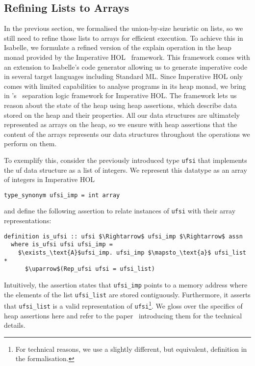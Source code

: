 \documentclass[
  sigplan,
  10pt,
  anonymous,
  review,
  ]{acmart}
\begin{document}
\subsection{Refining Lists to Arrays\label{sec:imperative_hol}}
In the previous section, we formalised the union-by-size heuristic on lists,
so we still need to refine those lists to arrays for efficient execution. 
To achieve this in Isabelle, we formulate a refined version of the explain operation in the heap monad provided by the Imperative HOL~\cite{imperative_hol} framework.
This framework comes with an extension to Isabelle's code generator allowing us to generate imperative code in several target languages including Standard ML. 
Since Imperative HOL only comes with limited capabilities to analyse programs in its heap monad, 
we bring in \citeauthor{uf_isabelle}'s~\cite{uf_isabelle} separation logic framework for Imperative HOL.
The framework lets us reason about the state of the heap using heap assertions, which describe data stored on the heap and their properties.
All our data structures are ultimately represented as arrays on the heap,
so we ensure with heap assertions that the content of the arrays represents our data structures throughout the operations we perform on them. 

To exemplify this, consider the previously introduced type \lstinline|ufsi| that implements the \acrshort{uf} data structure as a list of integers.
We represent this datatype as an array of integers in Imperative HOL
\begin{lstlisting}
type_synonym ufsi_imp = int array 
\end{lstlisting}
and define the following assertion to relate instances of \lstinline|ufsi| with their array representations:
\begin{lstlisting}
definition is_ufsi :: ufsi $\Rightarrow$ ufsi_imp $\Rightarrow$ assn
  where is_ufsi ufsi ufsi_imp =
    $\exists_\text{A}$ufsi_imp. ufsi_imp $\mapsto_\text{a}$ ufsi_list *
      $\uparrow$(Rep_ufsi ufsi = ufsi_list)
\end{lstlisting}
Intuitively, the assertion states that \lstinline|ufsi_imp| points to a memory address where the elements of the list \lstinline|ufsi_list| are stored contiguously.
Furthermore, it asserts that \lstinline|ufsi_list| is a valid representation of \lstinline|ufsi|\footnote{For technical reasons, we use a slightly different, but equivalent, definition in the formalisation.}. 
We gloss over the specifics of heap assertions here and refer to the paper~\cite{uf_isabelle} introducing them for the technical details. 
\end{document}
